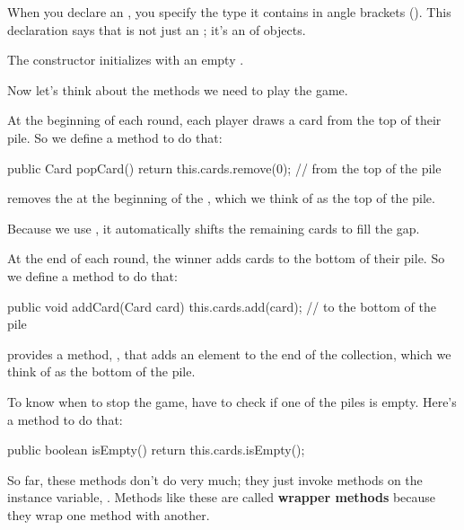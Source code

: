 When you declare an , you specify the type it contains in angle brackets (\java{<>}).
This declaration says that  is not just an ; it's an  of  objects.

The constructor initializes  with an empty .


Now let's think about the methods we need to play the game.

At the beginning of each round, each player draws a card from the top of their pile.
So we define a method to do that:


\begin{code}
public Card popCard() {
    return this.cards.remove(0);  // from the top of the pile
}
\end{code}

 removes the  at the beginning of the , which we think of as the top of the pile.

Because we use , it automatically shifts the remaining cards to fill the gap.

At the end of each round, the winner adds cards to the bottom of their pile.
So we define a method to do that:

\begin{code}
public void addCard(Card card) {
    this.cards.add(card);        // to the bottom of the pile
}
\end{code}

 provides a method, , that adds an element to the end of the collection, which we think of as the bottom of the pile.

To know when to stop the game, have to check if one of the piles is empty.
Here's a method to do that: 

\begin{code}
public boolean isEmpty() {
    return this.cards.isEmpty();
}
\end{code}

So far, these methods don't do very much; they just invoke methods on the instance variable, .
Methods like these are called {\bf wrapper methods} because they wrap one method with another.

